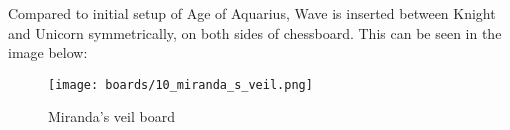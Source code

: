 Compared to initial setup of Age of Aquarius, Wave is inserted between Knight and Unicorn
symmetrically, on both sides of chessboard. This can be seen in the image below:

\noindent
\begin{figure}[h]
\texttt{[image: boards/10\_miranda\_s\_veil.png]}
\caption{Miranda's veil board}
\label{fig:10_miranda_s_veil}
\end{figure}

\clearpage %
